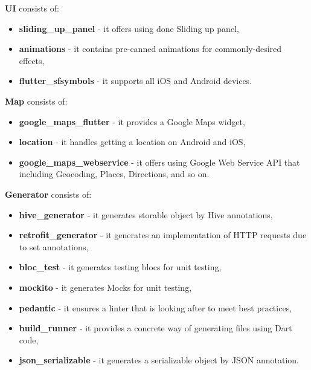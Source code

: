 \textbf{UI} consists of:
\begin{itemize}
    \item \textbf{sliding\_up\_panel} - it offers using done Sliding up panel,
    \item \textbf{animations} - it contains pre-canned animations for commonly-desired effects,
    \item \textbf{flutter\_sfsymbols} - it supports all iOS and Android devices.
\end{itemize}
\textbf{Map} consists of:
\begin{itemize}
    \item \textbf{google\_maps\_flutter} - it provides a Google Maps widget,
    \item \textbf{location} - it handles getting a location on Android and iOS,
    \item \textbf{google\_maps\_webservice} - it offers using Google Web Service API that including Geocoding, Places, Directions, and so on.
\end{itemize}
\textbf{Generator} consists of:
\begin{itemize}
    \item \textbf{hive\_generator} - it generates storable object by Hive annotations,
    \item \textbf{retrofit\_generator} - it generates an implementation of HTTP requests due to set annotations,
    \item \textbf{bloc\_test} - it generates testing blocs for unit testing,
    \item \textbf{mockito} - it generates Mocks for unit testing,
    \item \textbf{pedantic} - it ensures a linter that is looking after to meet best practices,
    \item \textbf{build\_runner} - it provides a concrete way of generating files using Dart code,
    \item \textbf{json\_serializable} - it generates a serializable object by JSON annotation.
\end{itemize}
